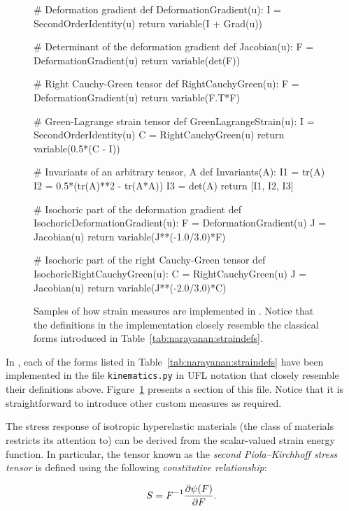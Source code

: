 \begin{figure}[ht]
\begin{python}
# Deformation gradient
def DeformationGradient(u):
    I = SecondOrderIdentity(u)
    return variable(I + Grad(u))

# Determinant of the deformation gradient
def Jacobian(u):
    F = DeformationGradient(u)
    return variable(det(F))

# Right Cauchy-Green tensor
def RightCauchyGreen(u):
    F = DeformationGradient(u)
    return variable(F.T*F)

# Green-Lagrange strain tensor
def GreenLagrangeStrain(u):
    I = SecondOrderIdentity(u)
    C = RightCauchyGreen(u)
    return variable(0.5*(C - I))

# Invariants of an arbitrary tensor, A
def Invariants(A):
    I1 = tr(A)
    I2 = 0.5*(tr(A)**2 - tr(A*A))
    I3 = det(A)
    return [I1, I2, I3]

# Isochoric part of the deformation gradient
def IsochoricDeformationGradient(u):
    F = DeformationGradient(u)
    J = Jacobian(u)
    return variable(J**(-1.0/3.0)*F)

# Isochoric part of the right Cauchy-Green tensor
def IsochoricRightCauchyGreen(u):
    C = RightCauchyGreen(u)
    J = Jacobian(u)
    return variable(J**(-2.0/3.0)*C)
\end{python}
\caption{Samples of how strain measures are implemented in
  \twist. Notice that the definitions in the implementation closely
  resemble the classical forms introduced in
  Table~\ref{tab:narayanan:straindefs}.}
\label{code:narayanan:kinematics.py}
\end{figure}

In \twist, each of the forms listed in
Table~\ref{tab:narayanan:straindefs} have been implemented in the file
{\tt kinematics.py} in UFL notation that closely resemble their
definitions above. Figure~\ref{code:narayanan:kinematics.py} presents
a section of this file. Notice that it is straightforward to introduce
other custom measures as required.

The stress response of isotropic hyperelastic materials (the class of
materials \twist{} restricts its attention to) can be derived from the
scalar-valued strain energy function. In particular, the tensor known
as the {\em second Piola--Kirchhoff stress tensor} is defined using the
following {\em constitutive relationship}:

\begin{equation}
\mbox{$ S$} = \mbox{$ F$}^{-1} \frac{\partial \psi(\mbox{$ F$})}{\partial \mbox{$ F$}}.
\end{equation}

